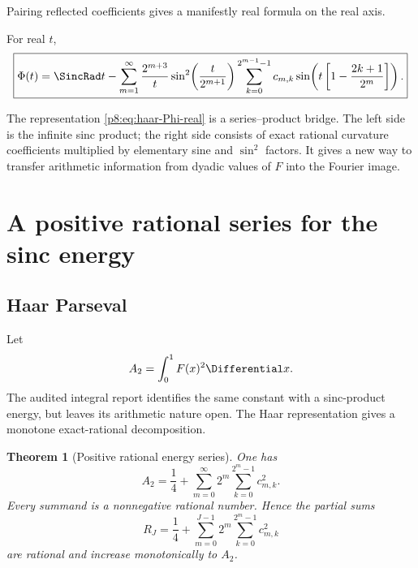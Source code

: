 \documentclass[11pt]{article}
\newtheorem{theorem}{Theorem}[section]
\theoremstyle{definition}
\theoremstyle{remark}
\begin{document}
Pairing reflected coefficients gives a manifestly real formula on the real
axis.

\begin{corollary}
\label{p8:cor:haar-Phi-real}
For real $t$,
\begin{equation}
 \boxed{\displaystyle
 \Phi(t)=\SincRad t-
 \sum_{m=1}^\infty\frac{2^{m+3}}{t}
 \sin^2\!\left(\frac{t}{2^{m+1}}\right)
 \sum_{k=0}^{2^{m-1}-1}c_{m,k}
 \sin\!\left(t\left[1-\frac{2k+1}{2^m}\right]\right).} \label{p8:eq:haar-Phi-real}
\end{equation}
\end{corollary}

The representation \eqref{p8:eq:haar-Phi-real} is a series--product bridge.  The
left side is the infinite sinc product; the right side consists of exact
rational curvature coefficients multiplied by elementary sine and
$\sin^2$ factors.  It gives a new way to transfer arithmetic information from
dyadic values of $F$ into the Fourier image.

\section{A positive rational series for the sinc energy}
\label{p8:sec:energy}

\subsection{Haar Parseval}

Let
\begin{equation}
 A_2=\int_0^1F(x)^2\Differential x.                                \label{p8:eq:A2-definition}
\end{equation}
The audited integral report identifies the same constant with a sinc-product
energy, but leaves its arithmetic nature open.  The Haar representation gives
a monotone exact-rational decomposition.

\begin{theorem}[Positive rational energy series]
\label{p8:thm:A2-rational-series}
One has
\begin{equation}
 \boxed{\displaystyle
 A_2=\frac14+
 \sum_{m=0}^\infty2^m\sum_{k=0}^{2^m-1}c_{m,k}^2.}       \label{p8:eq:A2-rational-series}
\end{equation}
Every summand is a nonnegative rational number.  Hence the partial sums
\begin{equation}
 R_J=\frac14+
 \sum_{m=0}^{J-1}2^m\sum_{k=0}^{2^m-1}c_{m,k}^2          \label{p8:eq:Rj-definition}
\end{equation}
are rational and increase monotonically to $A_2$.
\end{theorem}
\end{document}
